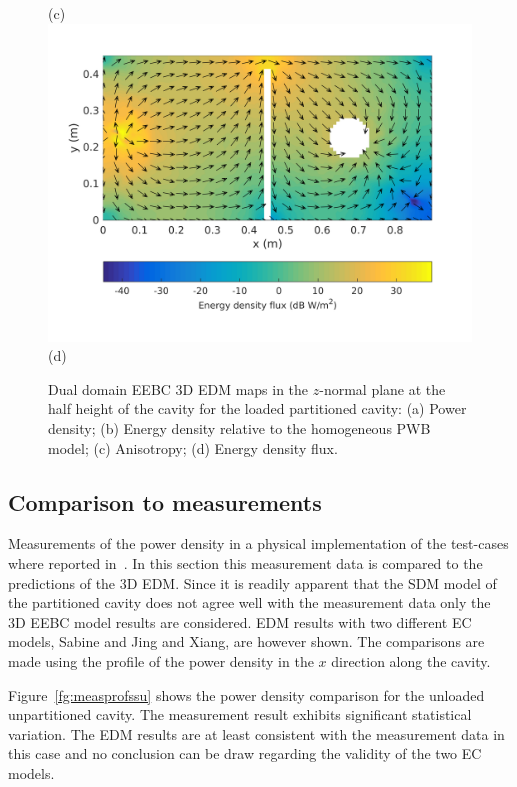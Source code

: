 \documentclass[a4paper]{article}
\numberwithin{equation}{section}
\newcounter{Figure}
\begin{document}
\begin{figure}[hp]
\begin{center}
{\footnotesize (c)}\\
\vspace{2mm}
\includegraphics[trim={0 8mm 0 12mm},clip,width=0.52\linewidth]{figures/DDM-EEBC_3D_DL_EnergyDensityFluxMap}\\
{\footnotesize (d)}\\
\vspace{-2mm}
\caption{\label{fg:partcylddm_maps} Dual domain EEBC 3D EDM maps in the $z$-normal plane at the half height of the cavity for the 
loaded partitioned cavity: (a) Power density; (b) Energy density relative to the homogeneous PWB model;
(c) Anisotropy; (d) Energy density flux.}
\end{center}
\end{figure}

\clearpage

\subsection[Comparison to measurements]{Comparison to measurements}
\label{sc:res:meas}

Measurements of the power density in a physical implementation of the test-cases where reported in~\citep{Flintoft2017b}. 
In this section this measurement data is compared to the predictions of the 3D EDM. Since it is readily apparent that the 
SDM model of the partitioned cavity does not agree well with the measurement data only the 3D EEBC model results are 
considered. EDM results with two different EC models, Sabine and Jing and Xiang, are however shown. The comparisons
are made using the profile of the power density in the $x$ direction along the cavity.

Figure~\ref{fg:measprofssu} shows the power density comparison for the unloaded unpartitioned cavity. The measurement 
result exhibits significant statistical variation. The EDM results are at least consistent with the measurement data
in this case and no conclusion can be draw regarding the validity of the two EC models.
\end{document}
